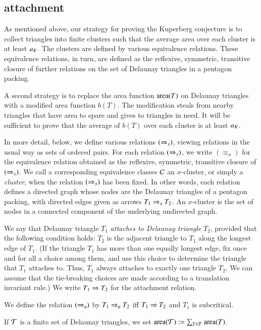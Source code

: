 \subsection{attachment}

As mentioned above, our strategy for proving the Kuperberg conjecture
is to collect triangles into finite clusters such that the average
area over each cluster is at least $a_K$.  The clusters are defined by
various equivalence relations.  These equivalence relations, in turn,
are defined as the reflexive, symmetric, transitive closure of further
relations on the set of Delaunay triangles in a pentagon packing.

A second strategy is to replace the area function ${\operatorname{area}}(T)$ on Delaunay
triangles with a modified area function $b(T)$.  The modification steals from
nearby triangles that have area to spare and gives to triangles in need.  It will 
be sufficient to prove that the average of $b(T)$ over each cluster is at least $a_K$.


In more detail, below, we define various relations $(\Rightarrow_{x})$, viewing
relations in the usual way as sets of ordered pairs.  For each
relation $(\Rightarrow_{x})$, we write ${(\equiv_{x})}$ for the equivalence
relation obtained as the reflexive, symmetric, transitive closure of
$(\Rightarrow_{x})$.  We call a corresponding equivalence classes $\mathcal C$ an
$x$-cluster, or simply a {\it cluster}, when the relation $(\Rightarrow_{x})$
has been fixed.  In other words, each relation defines a directed
graph whose nodes are the Delaunay triangles of a pentagon packing,
with directed edges given as arrows $T_1\Rightarrow_{x} T_2$.  An $x$-cluster
is the set of nodes in a connected component of the underlying
undirected graph.

We say that Delaunay triangle $T_1$ {\it attaches to Delaunay
  triangle} $T_2$, provided that the following condition holds: $T_2$
is the adjacent triangle to $T_1$ along the longest edge of $T_1$.
(If the triangle $T_1$ has more than one equally longest edge, fix
once and for all a choice among them, and use this choice to determine
the triangle that $T_1$ attaches to.  Thus, $T_1$ always attaches to
exactly one triangle $T_2$.  We can assume that the tie-breaking
choices are made according to a translation invariant rule.)  We write
$T_1 \Rightarrow T_2$ for the attachment relation.


We define the relation $(\Rightarrow_{a})$ by $T_1 \Rightarrow_{a} T_2$ iff
$T_1\Rightarrow T_2$ and $T_1$ is subcritical.

If $\mathcal T$ is a finite set of Delaunay triangles, we set ${\operatorname{area}}(\mathcal T):=\sum_{T\in\mathcal T} {\operatorname{area}}(T)$.

